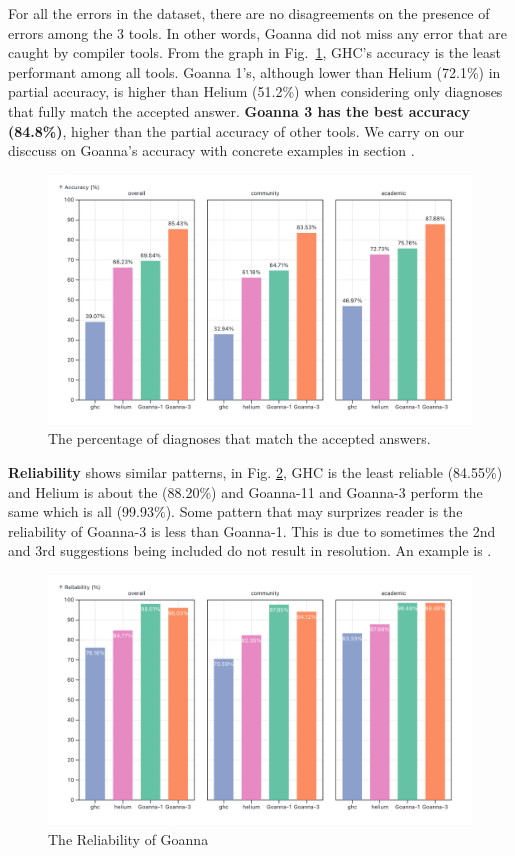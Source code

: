\documentclass[pdflatex,sn-mathphys-num]{sn-jnl}%
\begin{document}
  For all the errors in the dataset, there are no disagreements on the presence of errors among the 3 tools. In other words, Goanna did not miss any error that are caught by compiler tools. From the graph in Fig.~\ref{fig:accuracy}, GHC's accuracy is the least performant among all tools. Goanna 1's, although lower than Helium (72.1\%) in partial accuracy, is higher than Helium (51.2\%) when considering only diagnoses that fully match the accepted answer. \textbf{Goanna 3 has the best accuracy (84.8\%)}, higher than the partial accuracy of other tools. We carry on our disccuss on Goanna's accuracy with concrete examples in section . 

  
     \begin{figure}[ht!]
        \centering
        \includegraphics[width=\linewidth]{images/accuracy.png}
        \caption{The percentage of diagnoses that match the accepted answers.} 
        \label{fig:accuracy}
    \end{figure}

  \textbf{Reliability} shows similar patterns, in Fig. \ref{fig:reliability}, GHC is the least reliable (84.55\%) and Helium is about the (88.20\%) and Goanna-11 and Goanna-3 perform the same which is all (99.93\%). Some pattern that may surprizes reader is the reliability of Goanna-3 is less than Goanna-1. This is due to sometimes the 2nd and 3rd suggestions being included do not result in resolution. An example is .

   \begin{figure}[ht!]
        \centering
        \includegraphics[width=\linewidth]{images/Reliability.png}
        \caption{The Reliability of Goanna} 
        \label{fig:reliability}
    \end{figure}
\end{document}
